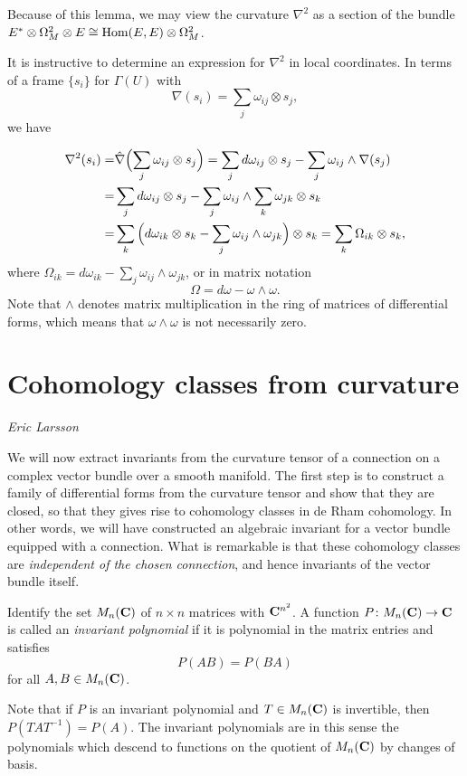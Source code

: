 \documentclass[a4paper,openany]{scrbook}
\newcommand{\chapterauthor}[1]{\hfill\emph{#1}\par\noindent}
\begin{document}
Because of this lemma, we may view the curvature $\nabla^2$ as a section of the bundle $E^* \otimes \Omega^2_M \otimes E \cong \operatorname{Hom}(E, E) \otimes \Omega^2_M$.

It is instructive to determine an expression for $\nabla^2$ in local coordinates. In terms of a frame $\{s_i\}$ for $\Gamma(U)$ with 
\[
\nabla(s_i)=\sum_j \omega_{ij} \otimes s_j,
\]
we have

\begin{align*}
\nabla^2(s_i) =& \hat{\nabla}\Bigl(\sum_j \omega_{ij} \otimes s_j\Bigr)
= \sum_j  d \omega_{ij} \otimes s_j - \sum_j \omega_{ij} \wedge \nabla(s_j) \\
=& \sum_j  d \omega_{ij} \otimes s_j - \sum_j \omega_{ij}\wedge \sum_k \omega_{jk} \otimes s_k \\
=& \sum_k \Big( d  \omega_{ik} \otimes s_k - \sum_j \omega_{ij} \wedge \omega_{jk} \Big)\otimes s_k
= \sum_k \Omega_{ik} \otimes s_k,
\end{align*} where $\Omega_{ik}= d \omega_{ik} - \sum_j \omega_{ij}\wedge \omega_{jk}$, or in matrix notation
\[
\Omega= d \omega - \omega \wedge \omega.
\]
Note that $\wedge$ denotes matrix multiplication in the ring of matrices of differential forms, which means that $\omega \wedge \omega$ is not necessarily zero.




\section{Cohomology classes from curvature}
\chapterauthor{Eric Larsson}

We will now extract invariants from the curvature tensor of a connection on a complex vector bundle over a smooth manifold. The first step is to construct a family of differential forms from the curvature tensor and show that they are closed, so that they gives rise to cohomology classes in de Rham cohomology. In other words, we will have constructed an algebraic invariant for a vector bundle equipped with a connection. What is remarkable is that these cohomology classes are \emph{independent of the chosen connection}, and hence invariants of the vector bundle itself.
\begin{defn}
Identify the set $M_n(\mathbf C)$ of $n \times n$ matrices with $\mathbf C^{n^2}$. A function $P \colon M_n(\mathbf C) \to \mathbf C$ is called an \emph{invariant polynomial} if it is polynomial in the matrix entries and satisfies
\[P(AB) = P(BA)\]
for all $A, B \in M_n(\mathbf C)$.
\end{defn}
Note that if $P$ is an invariant polynomial and $T \in M_n(\mathbf C)$ is invertible, then $P(TAT^{-1}) = P(A)$. The invariant polynomials are in this sense the polynomials which descend to functions on the quotient of $M_n(\mathbf C)$ by changes of basis.
\end{document}
